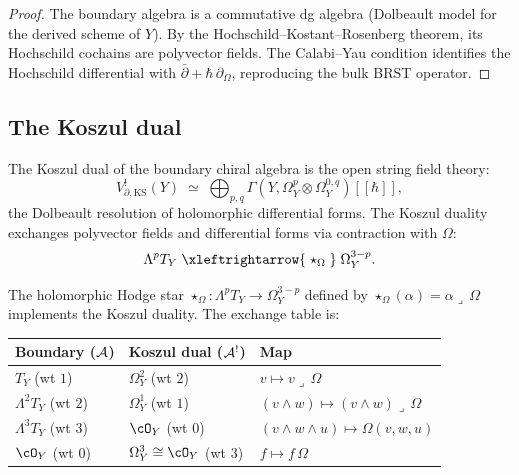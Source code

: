 \begin{proof}
The boundary algebra is a commutative dg algebra (Dolbeault model for
the derived scheme of $Y$). By the Hochschild--Kostant--Rosenberg
theorem, its Hochschild cochains are polyvector fields. The
Calabi--Yau condition identifies the Hochschild differential with
$\bar\partial + \hbar\,\partial_\Omega$, reproducing the bulk BRST
operator.
\end{proof}


\subsection{The Koszul dual}

\begin{definition}
\label{def:thqg-ks-koszul-dual}
The Koszul dual of the boundary chiral algebra is the open string
field theory:
\begin{equation}%
V_{\partial,\mathrm{KS}}^!(Y)
\;\simeq\;
\bigoplus_{p,q}
\Gamma(Y, \Omega^p_Y \otimes \Omega^{0,q}_Y)[[\hbar]],
\end{equation}
the Dolbeault resolution of holomorphic differential forms. The
Koszul duality exchanges polyvector fields and differential forms
via contraction with $\Omega$:
\begin{equation}%
\Lambda^p T_Y \;\xleftrightarrow{\;\star_\Omega\;}\; \Omega^{3-p}_Y.
\end{equation}
\end{definition}

\begin{proposition}
\label{prop:thqg-ks-koszul-hodge}
The holomorphic Hodge star $\star_\Omega: \Lambda^p T_Y \to
\Omega^{3-p}_Y$ defined by $\star_\Omega(\alpha) = \alpha \lrcorner\, \Omega$
implements the Koszul duality. The exchange table is:
\begin{center}
\renewcommand{\arraystretch}{1.2}
\small
\begin{tabular}{lll}
\textbf{Boundary} ($\mathcal{A}$)
 & \textbf{Koszul dual} ($\mathcal{A}^!$)
 & \textbf{Map} \\
\hline
$T_Y$ (wt $1$) & $\Omega^2_Y$ (wt $2$) & $v \mapsto v \lrcorner\, \Omega$ \\
$\Lambda^2 T_Y$ (wt $2$) & $\Omega^1_Y$ (wt $1$) & $(v \wedge w) \mapsto (v \wedge w) \lrcorner\, \Omega$ \\
$\Lambda^3 T_Y$ (wt $3$) & $\cO_Y$ (wt $0$) & $(v \wedge w \wedge u) \mapsto \Omega(v,w,u)$ \\
$\cO_Y$ (wt $0$) & $\Omega^3_Y \cong \cO_Y$ (wt $3$) & $f \mapsto f\,\Omega$
\end{tabular}
\end{center}
\end{proposition}

